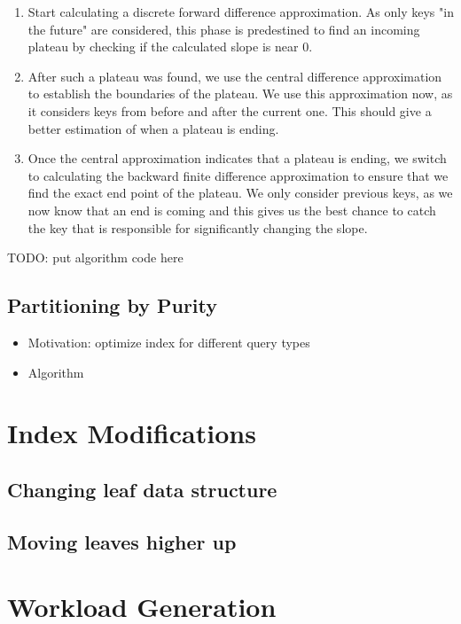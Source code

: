 \begin{enumerate}
    \item Start calculating a discrete forward difference approximation. As only keys "in the future" are considered, this phase is predestined to find an incoming plateau by checking if the calculated slope is near 0.
    \item After such a plateau was found, we use the central difference approximation to establish the boundaries of the plateau. We use this approximation now, as it considers keys from before and after the current one. This should give a better estimation of when a plateau is ending.
    \item Once the central approximation indicates that a plateau is ending, we switch to calculating the backward finite difference approximation to ensure that we find the exact end point of the plateau. We only consider previous keys, as we now know that an end is coming and this gives us the best chance to catch the key that is responsible for significantly changing the slope.
\end{enumerate}

TODO: put algorithm code here

\subsection{Partitioning by Purity} \label{sec:purity}
\begin{itemize}
    \item Motivation: optimize index for different query types
    \item Algorithm
\end{itemize}

\section{Index Modifications}
\subsection{Changing leaf data structure}
\subsection{Moving leaves higher up}

\section{Workload Generation}
